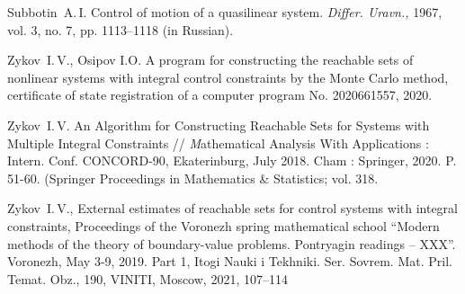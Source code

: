 \documentclass[../main.tex]{subfiles}
\begin{document}
\begin{thebibliography}{99}
Subbotin~A.\,I. Control of motion of a quasilinear system. \emph{Differ. Uravn.,} 1967, vol. 3, no. 7, pp. 1113–1118
(in Russian).

Zykov~I.\,V., Osipov I.O. A program for constructing the reachable sets of nonlinear systems with integral control constraints by the Monte Carlo method, certificate of state registration of a computer program No. 2020661557, 2020.

Zykov~I.\,V. An Algorithm for Constructing Reachable Sets for Systems with Multiple Integral Constraints  // {\textit Mathematical Analysis With Applications : Intern. Conf. CONCORD-90}, Ekaterinburg, July 2018. Cham : Springer, 2020. P. 51-60. (Springer Proceedings in Mathematics \& Statistics; vol. 318. 

Zykov~I.\,V., External estimates of reachable sets for control systems with integral constraints, Proceedings of the Voronezh spring mathematical school “Modern methods of the theory of boundary-value problems. Pontryagin readings – XXX”. Voronezh, May 3-9, 2019. Part 1, Itogi Nauki i Tekhniki. Ser. Sovrem. Mat. Pril. Temat. Obz., 190, VINITI, Moscow, 2021, 107–114 
\end{thebibliography}
\end{document}
